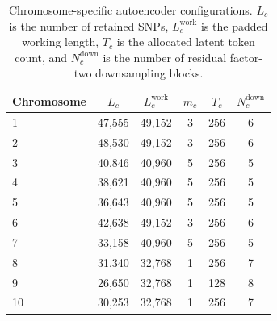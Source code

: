 \documentclass{article}
\begin{document}
\begin{table}[t]
\centering
\caption{
Chromosome-specific autoencoder configurations. \(L_c\) is the number of retained SNPs, \(L_c^{\mathrm{work}}\) is the padded working length, \(T_c\) is the allocated latent token count, and \(N_c^{\mathrm{down}}\) is the number of residual factor-two downsampling blocks.
}
\label{tab:ae_chrom_configs}
\small
\setlength{\tabcolsep}{4pt}
\renewcommand{\arraystretch}{0.95}
\begin{tabular}{lccccc}
\toprule
Chromosome & \(L_c\) & \(L_c^{\mathrm{work}}\) & \(m_c\) & \(T_c\) & \(N_c^{\mathrm{down}}\) \\ %
\midrule
1 & 47,555 & 49,152 & 3 & 256 & 6 \\ %
2 & 48,530 & 49,152 & 3 & 256 & 6 \\ %
3 & 40,846 & 40,960 & 5 & 256 & 5 \\ %
4 & 38,621 & 40,960 & 5 & 256 & 5 \\ %
5 & 36,643 & 40,960 & 5 & 256 & 5 \\ %
6 & 42,638 & 49,152 & 3 & 256 & 6 \\ %
7 & 33,158 & 40,960 & 5 & 256 & 5 \\ %
8 & 31,340 & 32,768 & 1 & 256 & 7 \\ %
9 & 26,650 & 32,768 & 1 & 128 & 8 \\ %
10 & 30,253 & 32,768 & 1 & 256 & 7 \\ %

\end{tabular}
\end{table}
\end{document}
